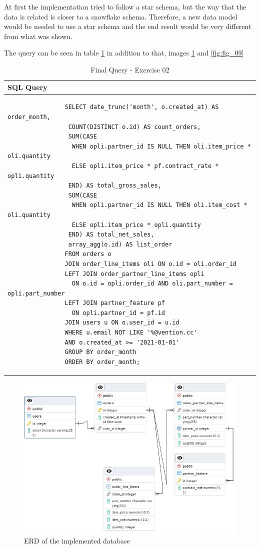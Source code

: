 \documentclass[]{report}
\begin{document}
At first the implementation tried to follow a star schema, but the way that the data is related is closer to a snowflake schema. Therefore, a new data model would be needed to use a star schema and the end result would be very different from what was shown.

The query can be seen in table \textcolor{blue}{\ref{tbl:sql_query}} in addition to that, images \textcolor{blue}{\ref{fig:fig_08}} and \textcolor{blue}{\ref{fig:fig_09}}

\begin{table}[h]
	\centering
	\begin{tabular}{l}
		\hline
		\textbf{SQL Query} \\
		\hline
		\begin{minipage}[t]{0.9\textwidth}
			\begin{verbatim}
				SELECT date_trunc('month', o.created_at) AS order_month,
				 COUNT(DISTINCT o.id) AS count_orders,
				 SUM(CASE
				  WHEN opli.partner_id IS NULL THEN oli.item_price * oli.quantity
				  ELSE opli.item_price * pf.contract_rate * opli.quantity
				 END) AS total_gross_sales,
				 SUM(CASE
				  WHEN opli.partner_id IS NULL THEN oli.item_cost * oli.quantity
				  ELSE opli.item_price * opli.quantity
				 END) AS total_net_sales,
				 array_agg(o.id) AS list_order
				FROM orders o
				JOIN order_line_items oli ON o.id = oli.order_id
				LEFT JOIN order_partner_line_items opli 
				  ON o.id = opli.order_id AND oli.part_number = opli.part_number
				LEFT JOIN partner_feature pf 
				  ON opli.partner_id = pf.id
				JOIN users u ON o.user_id = u.id
				WHERE u.email NOT LIKE '%@vention.cc'
				AND o.created_at >= '2021-01-01'
				GROUP BY order_month
				ORDER BY order_month;
			\end{verbatim}
		\end{minipage} \\
		\hline
	\end{tabular}
	\caption{Final Query - Exercise 02}
	\label{tbl:sql_query}
\end{table}


\begin{figure}[htb]
	\centering
	\includegraphics[width=1.1\textwidth]{01_data_modeling_resize}
	\caption{ERD of the implemented database}
	\label{fig:fig_08}
\end{figure}
\end{document}
